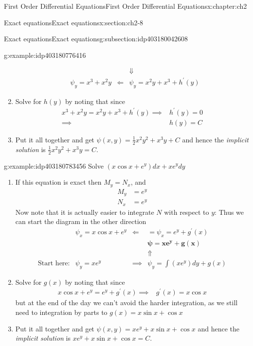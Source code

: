 \documentclass[oneside,10pt,]{book}
\numberwithin{equation}{section}
\numberwithin{equation}{section}
\newcommand{\amp}{&}
\begin{document}
\begin{chapterptx}{First Order Differential Equations}{}{First Order Differential Equations}{}{}{x:chapter:ch2}
\begin{sectionptx}{Exact equations}{}{Exact equations}{}{}{x:section:ch2-8}
\begin{subsectionptx}{Exact equations}{}{Exact equations}{}{}{g:subsection:idp403180042608}
\begin{example}{}{g:example:idp403180776416}
\begin{enumerate}
\begin{align*}
\amp  \amp  \amp \Downarrow\\
\amp \psi_{y}=x^{3}+x^{2}y \amp \Longleftarrow \amp \psi_{y}=x^{2}y+x^{3}+h^{\prime}(y)
\end{align*}
%
\item{}Solve for \(h(y)\) by noting that since%
\begin{align*}
x^{3}+x^{2}y=x^{2}y+x^{3}+h^{\prime}(y)\implies \amp h^{\prime}(y)=0\\
\implies \amp h(y)=C
\end{align*}
%
\item{}Put it all together and get \(\psi(x,y)=\frac{1}{2}x^{2}y^{2}+x^{3}y+C\) and hence the \emph{implicit solution} is \(\frac{1}{2}x^{2}y^{2}+x^{3}y=C.\)%
\end{enumerate}
\end{example}
\begin{example}{}{g:example:idp403180783456}%
Solve \(\left(x\cos x+e^{y}\right)dx+xe^{y}dy\)%
%
\begin{enumerate}
\item{}If this equation is exact then \(M_{y}=N_{x}\), and%
\begin{align*}
M_{y} \amp =e^{y}\\
N_{x} \amp =e^{y}
\end{align*}
Now note that it is actually easier to integrate \(N\) with respect to \(y\): Thus we can start the diagram in the other direction%
\begin{align*}
\amp \psi_{x}=x\cos x+e^{y} \amp \Longleftarrow \amp =\psi_{x}=e^{y}+g^{\prime}(x)\\
\amp  \amp  \amp \boldsymbol{\psi=xe^{y}+g(x)}\\
\amp  \amp  \amp \Uparrow\\
\text{Start here:} \amp \psi_{y}=xe^{y} \amp \implies \amp \psi_{y}=\int\left(xe^{y}\right)dy+g(x)
\end{align*}
%
\item{}Solve for \(g(x)\) by noting that since%
\begin{align*}
x\cos x+e^{y}=e^{y}+g^{\prime}(x)\implies \amp g^{\prime}(x)=x\cos x
\end{align*}
but at the end of the day we can't avoid the harder integration, as we still need to integration by parts to \(g(x)=x\sin x+\cos x\)%
\item{}Put it all together and get \(\psi(x,y)=xe^{y}+x\sin x+\cos x\) and hence the \emph{implicit solution} is \(xe^{y}+x\sin x+\cos x=C.\)%
\end{enumerate}
\begin{sageinput}

\end{sageinput}
\end{example}
\end{subsectionptx}
\end{sectionptx}
\end{chapterptx}
\end{document}
